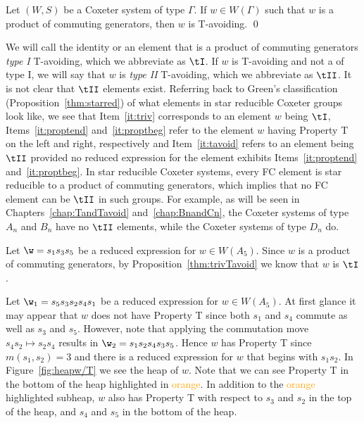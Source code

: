 \begin{proposition}\label{thm:trivTavoid}
Let $(W,S)$ be a Coxeter system of type $\Gamma$. If $w \in W(\Gamma)$ such that $w$ is a product of commuting generators, then $w$ is T-avoiding. \qed	
\end{proposition}

We will call the identity or an element that is a product of commuting generators \emph{type I} T-avoiding, which we abbreviate as \emph{$\tI$}. If $w$ is T-avoiding and not a of type I, we will say that $w$ is \emph{type II} T-avoiding, which we abbreviate as \emph{$\tII$}. It is not clear that $\tII$ elements exist. Referring back to Green's classification (Proposition~\ref{thm:starred}) of what elements in star reducible Coxeter groups look like, we see that Item~\ref{it:triv} corresponds to an element $w$ being $\tI$, Items~\ref{it:proptend} and~\ref{it:proptbeg} refer to the element $w$ having Property T on the left and right, respectively and Item~\ref{it:tavoid} refers to an element being $\tII$ provided no reduced expression for the element exhibits Items~\ref{it:proptend} and~\ref{it:proptbeg}. In star reducible Coxeter systems, every FC element is star reducible to a product of commuting generators, which implies that no FC element can be $\tII$ in such groups. For example, as will be seen in Chapters~\ref{chap:TandTavoid} and~\ref{chap:BnandCn}, the Coxeter systems of type $A_n$ and $B_n$ have no $\tII$ elements, while the Coxeter systems of type $D_n$ do.


\begin{example}\label{ex:tavoid}
Let $\w=s_1s_3s_5$ be a reduced expression for $w \in W(A_5)$.  Since $w$ is a product of commuting generators, by Proposition~\ref{thm:trivTavoid} we know that $w$ is $\tI$. %
\end{example}
\begin{example}\label{ex:prop-T}
Let $\w_1=s_5s_3s_2s_4s_1$ be a reduced expression for $w \in W(A_5)$. At first glance it may appear that $w$ does not have Property T since both $s_1$ and $s_4$ commute as well as $s_3$ and $s_5$. However, note that applying the commutation move $s_4s_2 \mapsto s_2s_4$ results in $\w_2=s_1s_2s_4s_3s_5$. Hence $w$ has Property T since $m(s_1,s_2)=3$ and there is a reduced expression for $w$ that begins with $s_1s_2$. In Figure~\ref{fig:heapw/T} we see the heap of $w$. Note that we can see Property T in the bottom of the heap highlighted in \textcolor{orange}{orange}. In addition to the \textcolor{orange}{orange} highlighted subheap, $w$ also has Property T with respect to $s_3$ and $s_2$ in the top of the heap, and $s_4$ and $s_5$ in the bottom of the heap.
\end{example}

